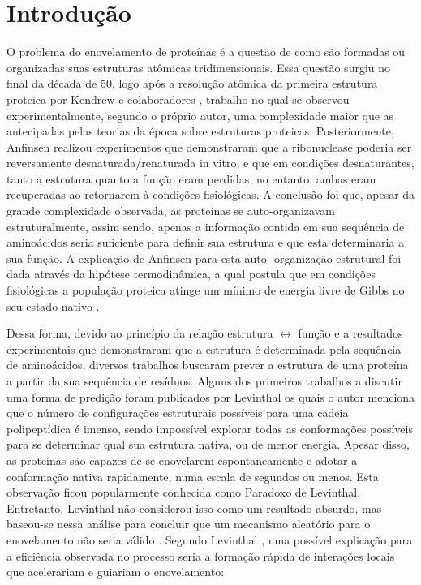 \chapter{Introdução}\label{ch:introducao}

O problema do enovelamento de proteínas é a questão de como são formadas ou organizadas suas estruturas atômicas tridimensionais. Essa questão surgiu no final da década de 50, logo após a resolução atômica da primeira estrutura proteica por Kendrew e colaboradores \cite{KENDREW:1953}, trabalho no qual se observou experimentalmente, segundo o próprio autor, uma complexidade maior que as antecipadas pelas teorias da época sobre estruturas proteicas. Posteriormente, Anfinsen \cite{Anfinsen:1968} realizou experimentos que demonstraram que a ribonuclease poderia ser reversamente desnaturada/renaturada in vitro, e que em condições desnaturantes, tanto a estrutura quanto a função eram perdidas, no entanto, ambas eram recuperadas ao retornarem à condições fisiológicas. A conclusão foi que, apesar da grande complexidade observada, as proteínas se auto-organizavam estruturalmente, assim sendo, apenas a informação contida em sua sequência de aminoácidos seria suficiente para definir sua estrutura e que esta determinaria a sua função. A explicação de Anfinsen para esta auto- organização estrutural foi dada através da hipótese termodinâmica, a qual postula que em condições fisiológicas a população proteica atinge um mínimo de energia livre de Gibbs no seu estado nativo \cite{Rose:2001}.

Dessa forma, devido ao princípio da relação estrutura $\leftrightarrow$ função e a resultados experimentais que demonstraram que a estrutura é determinada pela sequência de aminoácidos, diversos trabalhos buscaram prever a estrutura de uma proteína a partir da sua sequência de resíduos. Alguns dos primeiros trabalhos a discutir uma forma de predição foram publicados por Levinthal \cite{Levinthal:1963, Levinthal:} os quais o autor menciona que o número de configurações estruturais possíveis para uma cadeia polipeptídica é imenso, sendo impossível explorar todas as conformações possíveis para se determinar qual sua estrutura nativa, ou de menor energia. Apesar disso, as proteínas são capazes de se enovelarem espontaneamente e adotar a conformação nativa rapidamente, numa escala de segundos ou menos. Esta observação ficou popularmente conhecida como Paradoxo de Levinthal. Entretanto, Levinthal não considerou isso como um resultado absurdo, mas baseou-se nessa análise para concluir que um mecanismo aleatório para o enovelamento não seria válido \cite{Ben-Naim:2007}. Segundo Levinthal \cite{Levinthal:}, uma possível explicação para a eficiência observada no processo seria a formação rápida de interações locais que acelerariam e guiariam o enovelamento:

